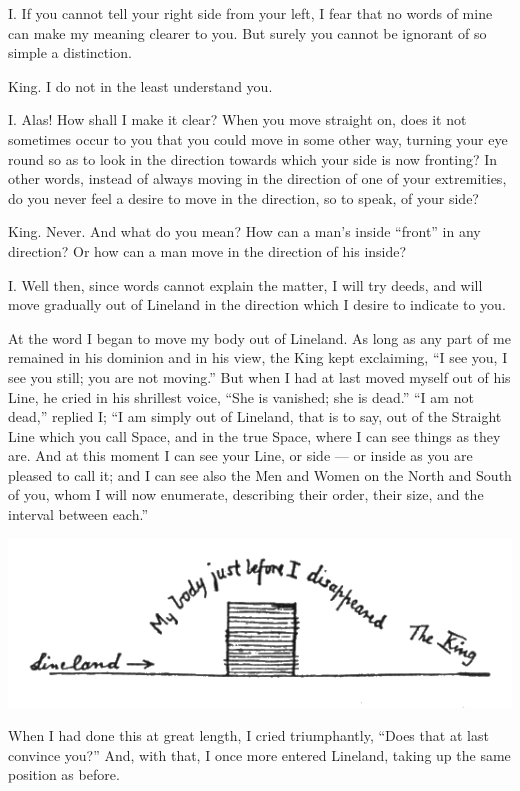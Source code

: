 \documentclass[12pt, a4paper, twoside]{memoir}
\begin{document}
I. If you cannot tell your right side from your left, I fear that no words of
mine can make my meaning clearer to you. But surely you cannot be ignorant of
so simple a distinction.

King. I do not in the least understand you.

I. Alas! How shall I make it clear? When you move straight on, does it not
sometimes occur to you that you could move in some other way, turning your eye
round so as to look in the direction towards which your side is now fronting?
In other words, instead of always moving in the direction of one of your
extremities, do you never feel a desire to move in the direction, so to speak,
of your side?

King. Never. And what do you mean? How can a man's inside ``front'' in any
direction? Or how can a man move in the direction of his inside?

I. Well then, since words cannot explain the matter, I will try deeds, and
will move gradually out of Lineland in the direction which I desire to
indicate to you.

At the word I began to move my body out of Lineland. As long as any part of me
remained in his dominion and in his view, the King kept exclaiming, ``I see
you, I see you still; you are not moving.'' But when I had at last moved myself
out of his Line, he cried in his shrillest voice, ``She is vanished; she is
dead.'' ``I am not dead,'' replied I; ``I am simply out of Lineland, that is to
say, out of the Straight Line which you call Space, and in the true Space,
where I can see things as they are. And at this moment I can see your Line, or
side --- or inside as you are pleased to call it; and I can see also the Men and
Women on the North and South of you, whom I will now enumerate, describing
their order, their size, and the interval between each.''

\includegraphics[trim=20mm 0mm 0mm 0mm,width=\linewidth]{fig7}

When I had done this at great length, I cried triumphantly, ``Does that at last
convince you?'' And, with that, I once more entered Lineland, taking up the
same position as before.
\end{document}
